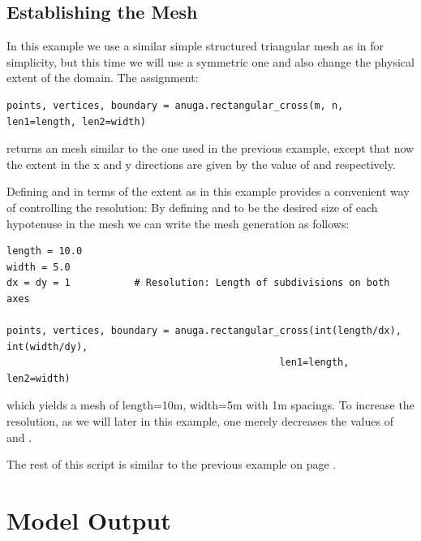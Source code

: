\documentclass{manual}
\begin{document}
\subsection{Establishing the Mesh}

In this example we use a similar simple structured triangular mesh as in 
for simplicity, but this time we will use a symmetric one and also
change the physical extent of the domain. The assignment:

\begin{verbatim}
points, vertices, boundary = anuga.rectangular_cross(m, n, len1=length, len2=width)
\end{verbatim}

returns an  mesh similar to the one used in the previous example, except that now the
extent in the x and y directions are given by the value of  and 
respectively.

Defining  and  in terms of the extent as in this example provides a convenient way of
controlling the resolution: By defining  and  to be the desired size of each
hypotenuse in the mesh we can write the mesh generation as follows:

\begin{verbatim}
length = 10.0
width = 5.0
dx = dy = 1           # Resolution: Length of subdivisions on both axes

points, vertices, boundary = anuga.rectangular_cross(int(length/dx), int(width/dy),
                                               len1=length, len2=width)
\end{verbatim}

which yields a mesh of length=10m, width=5m with 1m spacings. To increase the resolution,
as we will later in this example, one merely decreases the values of  and .

The rest of this script is similar to the previous example on page \pageref{ref:runup_py_code}.


\section{Model Output}
\end{document}
